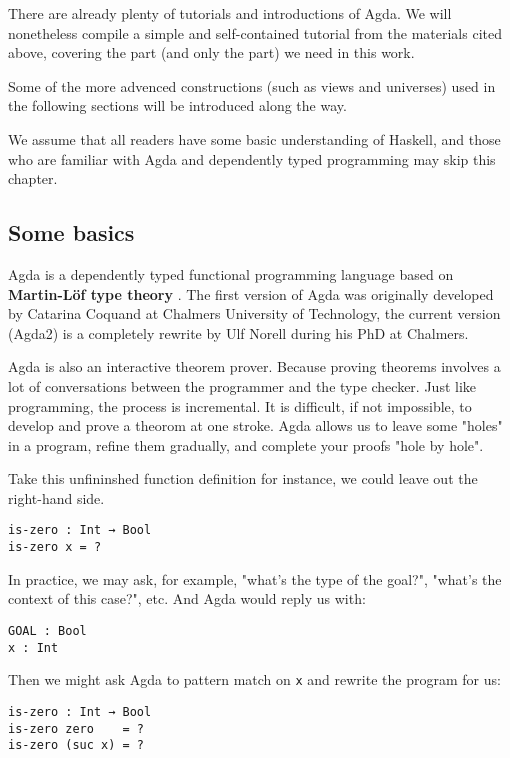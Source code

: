 \documentclass[12pt, a4paper]{article}
\begin{document}
There are already plenty of tutorials and introductions of Agda\cite{norell2009dependently}\cite{FLOLAC16DTP}\cite{brutal}.
We will nonetheless compile a simple and self-contained tutorial from the
materials cited above, covering the part (and only the part) we need in this work.

Some of the more advenced constructions (such as views and universes) used in
the following sections will be introduced along the way.

We assume that all readers have some basic understanding of Haskell, and those
who are familiar with Agda and dependently typed programming may skip this chapter.

\subsection{Some basics}
Agda is a dependently typed functional programming language based on
\textbf{Martin-Löf type theory} \cite{martin1984intuitionistic}.
The first version of Agda was originally developed by Catarina Coquand at Chalmers
University of Technology, the current version (Agda2) is a completely rewrite by
Ulf Norell during his PhD at Chalmers.

Agda is also an interactive theorem prover. Because proving theorems involves a
lot of conversations between the programmer and the type checker. Just like programming,
the process is incremental. It is difficult, if not impossible, to develop and
prove a theorom at one stroke. Agda allows us to leave some "holes" in a
program, refine them gradually, and complete your proofs "hole by hole".

Take this unfininshed function definition for instance, we could leave out the
right-hand side.

\begin{lstlisting}
is-zero : Int → Bool
is-zero x = ?
\end{lstlisting}

In practice, we may ask, for example, "what's the type of the goal?",
 "what's the context of this case?", etc. And Agda would reply us with:

\begin{lstlisting}
GOAL : Bool
x : Int
\end{lstlisting}

Then we might ask Agda to pattern match on {\lstinline|x|} and rewrite the program for us:

\begin{lstlisting}
is-zero : Int → Bool
is-zero zero    = ?
is-zero (suc x) = ?
\end{lstlisting}
\end{document}
